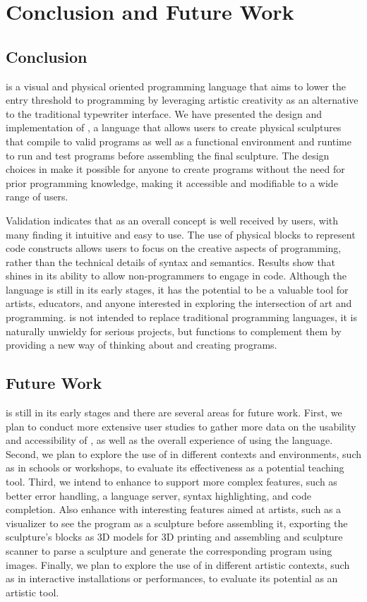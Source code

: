 
\section{Conclusion and Future Work}
\label{sec:conclusion}
\subsection{Conclusion}
\label{sec:conclusion:conclusion}
\sculpt is a visual and physical oriented programming language that aims to lower the entry threshold to programming by leveraging artistic creativity as an alternative to the traditional typewriter interface.
We have presented the design and implementation of \sculpt, a language that allows users to create physical sculptures that compile to valid programs as well as a functional environment and runtime to run and test programs before assembling the final sculpture.
The design choices in \sculpt make it possible for anyone to create programs without the need for prior programming knowledge, making it accessible and modifiable to a wide range of users.

Validation indicates that \sculpt as an overall concept is well received by users, with many finding it intuitive and easy to use.
The use of physical blocks to represent code constructs allows users to focus on the creative aspects of programming, rather than the technical details of syntax and semantics.
Results show that \sculpt shines in its ability to allow non-programmers to engage in code.
Although the language is still in its early stages, it has the potential to be a valuable tool for artists, educators, and anyone interested in exploring the intersection of art and programming.
\sculpt is not intended to replace traditional programming languages, it is naturally unwieldy for serious projects, but functions to complement them by providing a new way of thinking about and creating programs.




\subsection{Future Work}
\label{sec:conclusion:future}
\sculpt is still in its early stages and there are several areas for future work.
First, we plan to conduct more extensive user studies to gather more data on the usability and accessibility of \sculpt, as well as the overall experience of using the language.
Second, we plan to explore the use of \sculpt in different contexts and environments, such as in schools or workshops, to evaluate its effectiveness as a potential teaching tool.
Third, we intend to enhance \sculpter to support more complex features, such as better error handling, a language server, syntax highlighting, and code completion.
Also enhance \sculpter with interesting features aimed at artists, such as a visualizer to see the program as a sculpture before assembling it, exporting the sculpture's blocks as 3D models for 3D printing and assembling and sculpture scanner to parse a sculpture and generate the corresponding program using images.
Finally, we plan to explore the use of \sculpt in different artistic contexts, such as in interactive installations or performances, to evaluate its potential as an artistic tool.

\endinput

